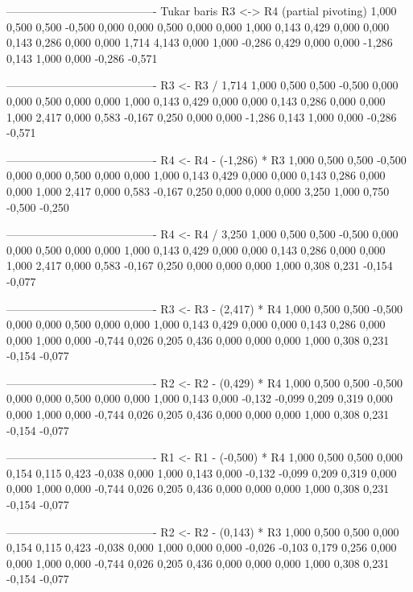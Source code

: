 \documentclass[12pt]{article}
\begin{document}
\begin{enumerate}
\begin{keluaran}
----------------------------------------
Tukar baris R3 <-> R4 (partial pivoting)
1,000   0,500   0,500   -0,500  0,000   0,000   0,500   0,000
0,000   1,000   0,143   0,429   0,000   0,000   0,143   0,286
0,000   0,000   1,714   4,143   0,000   1,000   -0,286  0,429
0,000   0,000   -1,286  0,143   1,000   0,000   -0,286  -0,571

----------------------------------------
R3 <- R3 / 1,714
1,000   0,500   0,500   -0,500  0,000   0,000   0,500   0,000
0,000   1,000   0,143   0,429   0,000   0,000   0,143   0,286
0,000   0,000   1,000   2,417   0,000   0,583   -0,167  0,250
0,000   0,000   -1,286  0,143   1,000   0,000   -0,286  -0,571

----------------------------------------
R4 <- R4 - (-1,286) * R3
1,000   0,500   0,500   -0,500  0,000   0,000   0,500   0,000
0,000   1,000   0,143   0,429   0,000   0,000   0,143   0,286
0,000   0,000   1,000   2,417   0,000   0,583   -0,167  0,250
0,000   0,000   0,000   3,250   1,000   0,750   -0,500  -0,250

----------------------------------------
R4 <- R4 / 3,250
1,000   0,500   0,500   -0,500  0,000   0,000   0,500   0,000
0,000   1,000   0,143   0,429   0,000   0,000   0,143   0,286
0,000   0,000   1,000   2,417   0,000   0,583   -0,167  0,250
0,000   0,000   0,000   1,000   0,308   0,231   -0,154  -0,077

----------------------------------------
R3 <- R3 - (2,417) * R4
1,000   0,500   0,500   -0,500  0,000   0,000   0,500   0,000
0,000   1,000   0,143   0,429   0,000   0,000   0,143   0,286
0,000   0,000   1,000   0,000   -0,744  0,026   0,205   0,436
0,000   0,000   0,000   1,000   0,308   0,231   -0,154  -0,077

----------------------------------------
R2 <- R2 - (0,429) * R4
1,000   0,500   0,500   -0,500  0,000   0,000   0,500   0,000
0,000   1,000   0,143   0,000   -0,132  -0,099  0,209   0,319
0,000   0,000   1,000   0,000   -0,744  0,026   0,205   0,436
0,000   0,000   0,000   1,000   0,308   0,231   -0,154  -0,077

----------------------------------------
R1 <- R1 - (-0,500) * R4
1,000   0,500   0,500   0,000   0,154   0,115   0,423   -0,038
0,000   1,000   0,143   0,000   -0,132  -0,099  0,209   0,319
0,000   0,000   1,000   0,000   -0,744  0,026   0,205   0,436
0,000   0,000   0,000   1,000   0,308   0,231   -0,154  -0,077

----------------------------------------
R2 <- R2 - (0,143) * R3
1,000   0,500   0,500   0,000   0,154   0,115   0,423   -0,038
0,000   1,000   0,000   0,000   -0,026  -0,103  0,179   0,256
0,000   0,000   1,000   0,000   -0,744  0,026   0,205   0,436
0,000   0,000   0,000   1,000   0,308   0,231   -0,154  -0,077


\end{keluaran}
\end{enumerate}
\end{document}
